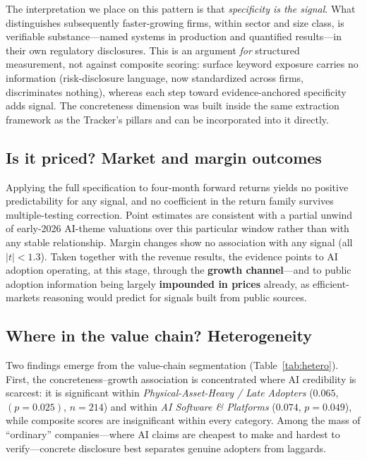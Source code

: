 \documentclass[11pt]{article}
\newcommand{\coef}[1]{\ensuremath{#1}}
\newcommand{\pval}[1]{\ensuremath{(p=#1)}}
\begin{document}
The interpretation we place on this pattern is that \emph{specificity is the
signal}. What distinguishes subsequently faster-growing firms, within sector
and size class, is verifiable substance---named systems in production and
quantified results---in their own regulatory disclosures. This is an argument
\emph{for} structured measurement, not against composite scoring: surface
keyword exposure carries no information (risk-disclosure language, now
standardized across firms, discriminates nothing), whereas each step toward
evidence-anchored specificity adds signal. The concreteness dimension was
built inside the same extraction framework as the Tracker's pillars and can be
incorporated into it directly.

\subsection{Is it priced? Market and margin outcomes}

Applying the full specification to four-month forward returns yields no
positive predictability for any signal, and no coefficient in the return
family survives multiple-testing correction. Point estimates are consistent
with a partial unwind of early-2026 AI-theme valuations over this particular
window rather than with any stable relationship.
Margin changes show no association with any signal (all $|t|<1.3$). Taken
together with the revenue results, the evidence points to AI adoption
operating, at this stage, through the \textbf{growth channel}---and to public
adoption information being largely \textbf{impounded in prices} already, as
efficient-markets reasoning would predict for signals built from public
sources.

\subsection{Where in the value chain? Heterogeneity}

Two findings emerge from the value-chain segmentation
(Table~\ref{tab:hetero}). First, the concreteness--growth association is
concentrated where AI credibility is scarcest: it is significant within
\emph{Physical-Asset-Heavy / Late Adopters} (\coef{0.065}, \pval{0.025},
$n=214$) and within \emph{AI Software \& Platforms} (\coef{0.074}, $p=0.049$), while composite scores are insignificant within every category.
Among the mass of ``ordinary'' companies---where AI claims are cheapest to make
and hardest to verify---concrete disclosure best separates genuine adopters
from laggards.
\end{document}
